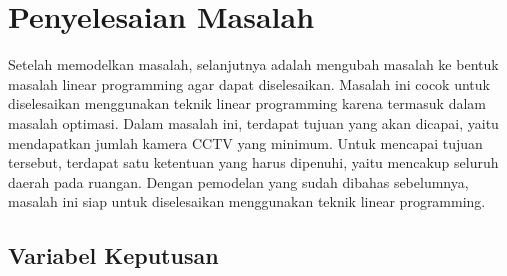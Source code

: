\section{Penyelesaian Masalah}
Setelah memodelkan masalah, selanjutnya adalah mengubah masalah ke bentuk masalah linear programming agar dapat diselesaikan. Masalah ini cocok untuk diselesaikan menggunakan teknik linear programming karena termasuk dalam masalah optimasi. Dalam masalah ini, terdapat tujuan yang akan dicapai, yaitu mendapatkan jumlah kamera CCTV yang minimum. Untuk mencapai tujuan tersebut, terdapat satu ketentuan yang harus dipenuhi, yaitu mencakup seluruh daerah pada ruangan. Dengan pemodelan yang sudah dibahas sebelumnya, masalah ini siap untuk diselesaikan menggunakan teknik linear programming.

\subsection{Variabel Keputusan}




















